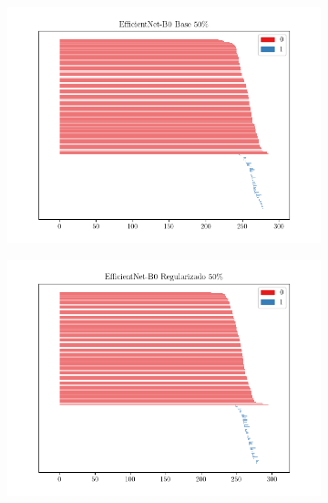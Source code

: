 \begin{figure}[H]
\begin{subfigure}
	\end{subfigure}
	\begin{subfigure}
		{.5\textwidth}
		\centering
		\includegraphics[width=\linewidth]{img/bar_efficientnet_trans_base_0.50.png}
	\end{subfigure}%
	\begin{subfigure}
		{.5\textwidth}
		\centering
		\includegraphics[width=\linewidth]{img/bar_efficientnet_trans_reg_0.50.png}
	\end{subfigure}
	\begin{subfigure}
		{.5\textwidth}
		\centering

\end{subfigure}
\end{figure}

